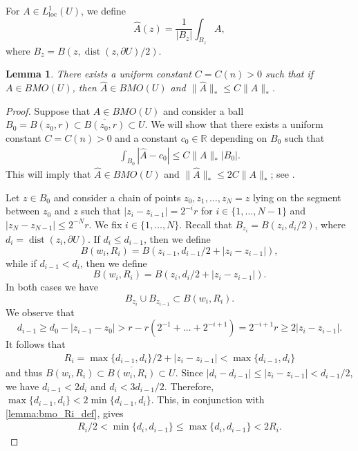 \documentclass{amsart}
\theoremstyle{plain}
\newtheorem{lemma}[theorem]{Lemma}
\theoremstyle{definition}
\theoremstyle{remark}
\numberwithin{equation}{section}
\numberwithin{theorem}{section}
\numberwithin{conjecture}{section}
\newcommand{\br}{\overline}
\newcommand{\R}{\mathbb R}
\newcommand{\1}{\mathbf 1}
\DeclareMathOperator{\dist}{{\mathrm{dist}}}
\DeclareMathOperator{\loc}{\mathrm{loc}}
\begin{document}
For $A\in L^1_{\loc}(U)$, we define
$$\widehat{A}(z) = \frac{1}{|B_z|} \int_{B_z} A,$$
where $B_z=B(z,\dist(z,\partial U)/2)$. 
\begin{lemma}\label{lemma:bmo_average}
There exists a uniform constant $C=C(n)>0$ such that if $A\in BMO(U)$, then $\widehat{A}\in BMO(U)$ and $\|\widehat A\|_*\leq C\|A\|_*$.
\end{lemma}
\begin{proof}
Suppose that $A\in BMO(U)$ and consider a ball $B_0=B(z_0,r)\subset \br{B(z_0,r)}\subset U$. We will show that there exists a uniform constant $C=C(n)>0$ and  a constant $c_0\in \R$ depending on $B_0$ such that
\begin{align}\label{lemma:bmo_equivalent}
\int_{B_0} |\widehat{A}- c_0| \leq C\|A\|_*|B_0|.
\end{align}
This will imply that $\widehat{A}\in BMO(U)$ and $\|\widehat{A}\|_{*}\leq 2C\|A\|_*$; see \cite[Lemma 14.49, p.~445]{WheedenZygmund:real}.

Let $z\in B_0$ and consider a chain of points $z_0,z_1,\dots,z_N=z$ lying on the segment between $z_0$ and $z$ such that $|z_i-z_{i-1}|=2^{-i}r$ for $i\in \{1,\dots,N-1\}$ and $|z_N-z_{N-1}|\leq 2^{-N}r$. We fix $i\in \{1,\dots,N\}$. Recall that $B_{z_i}=B(z_i,d_i/2)$, where $d_i=\dist(z_i,\partial U)$. If $d_i\leq d_{i-1}$, then we define $$B(w_i,R_i)= B(z_{i-1}, d_{i-1}/2 +|z_{i}-z_{i-1}|),$$ while if $d_{i-1}<d_i$, then we define $$B(w_i,R_i)=B(z_{i}, d_{i}/2 +|z_{i}-z_{i-1}|).$$
In both cases we have
$$B_{z_i}\cup B_{z_{i-1}}\subset B(w_i,R_i).$$
We observe that 
$$d_{i-1}\geq d_0-|z_{i-1}-z_0|>r- r(2^{-1}+\dots+ 2^{-i+1})=2^{-i+1}r\geq  2|z_i-z_{i-1}|.$$
It follows that 
\begin{align}\label{lemma:bmo_Ri_def}
R_i=\max\{d_{i-1},d_i\}/2 +|z_{i}-z_{i-1}|<\max\{d_{i-1},d_i\}
\end{align}
and thus $B(w_i,R_i)\subset \br{B(w_i,R_i)}\subset U$.  Since $|d_i-d_{i-1}|\leq |z_i-z_{i-1}|<d_{i-1}/2$, we have $d_{i-1}< 2d_i$ and $d_{i}<3d_{i-1}/2$. Therefore, $\max\{d_{i-1},d_i\}<2\min\{d_{i-1},d_i\}$. This, in conjunction with \eqref{lemma:bmo_Ri_def}, gives
\begin{align}\label{lemma:bmo_Ri}
R_i/2 <\min\{d_i,d_{i-1}\} \leq \max\{d_i,d_{i-1}\} < 2R_i.
\end{align}



\end{proof}
\end{document}
